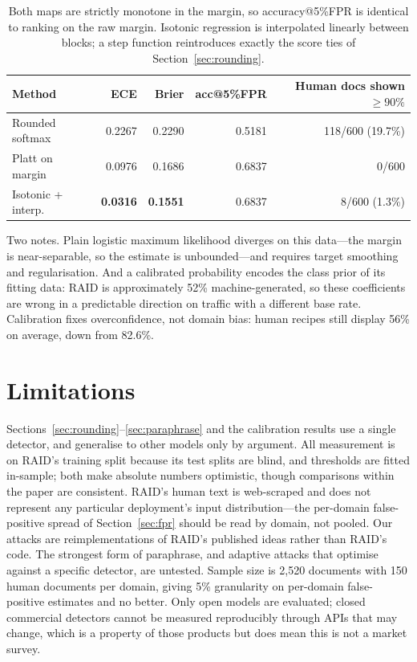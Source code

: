 \documentclass[11pt]{article}
\begin{document}
\begin{table}[h]
\centering
\begin{tabular}{lrrrr}
\toprule
Method & ECE & Brier & acc@5\%FPR & Human docs shown $\geq90\%$ \\
\midrule
Rounded softmax      & 0.2267 & 0.2290 & 0.5181 & 118/600 (19.7\%) \\
Platt on margin      & 0.0976 & 0.1686 & 0.6837 & 0/600 \\
Isotonic + interp.   & \textbf{0.0316} & \textbf{0.1551} & 0.6837 & 8/600 (1.3\%) \\
\bottomrule
\end{tabular}
\caption{Both maps are strictly monotone in the margin, so accuracy@5\%FPR is
identical to ranking on the raw margin. Isotonic regression is interpolated
linearly between blocks; a step function reintroduces exactly the score ties of
Section~\ref{sec:rounding}.}
\end{table}

Two notes. Plain logistic maximum likelihood diverges on this data---the margin
is near-separable, so the estimate is unbounded---and requires target smoothing
and regularisation. And a calibrated probability encodes the class prior of its
fitting data: RAID is approximately 52\% machine-generated, so these coefficients
are wrong in a predictable direction on traffic with a different base rate.
Calibration fixes overconfidence, not domain bias: human recipes still display
56\% on average, down from 82.6\%.

\section{Limitations}

Sections~\ref{sec:rounding}--\ref{sec:paraphrase} and the calibration results use
a single detector, and generalise to other models only by argument. All
measurement is on RAID's training split because its test splits are blind, and
thresholds are fitted in-sample; both make absolute numbers optimistic, though
comparisons within the paper are consistent. RAID's human text is web-scraped and
does not represent any particular deployment's input distribution---the
per-domain false-positive spread of Section~\ref{sec:fpr} should be read by
domain, not pooled. Our attacks are reimplementations of RAID's published ideas
rather than RAID's code. The strongest form of paraphrase, and adaptive attacks
that optimise against a specific detector, are untested. Sample size is 2{,}520
documents with 150 human documents per domain, giving 5\% granularity on
per-domain false-positive estimates and no better. Only open models are
evaluated; closed commercial detectors cannot be measured reproducibly through
APIs that may change, which is a property of those products but does mean this is
not a market survey.
\end{document}
